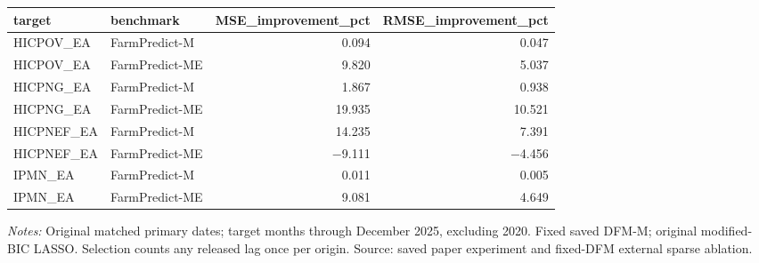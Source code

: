 \begin{threeparttable}
\begin{tabular}{llrr}
\toprule
target & benchmark & MSE\_improvement\_pct & RMSE\_improvement\_pct \\
\midrule
HICPOV\_EA & FarmPredict-M & 0.094 & 0.047 \\
HICPOV\_EA & FarmPredict-ME & 9.820 & 5.037 \\
HICPNG\_EA & FarmPredict-M & 1.867 & 0.938 \\
HICPNG\_EA & FarmPredict-ME & 19.935 & 10.521 \\
HICPNEF\_EA & FarmPredict-M & 14.235 & 7.391 \\
HICPNEF\_EA & FarmPredict-ME & $-$9.111 & $-$4.456 \\
IPMN\_EA & FarmPredict-M & 0.011 & 0.005 \\
IPMN\_EA & FarmPredict-ME & 9.081 & 4.649 \\
\bottomrule
\end{tabular}
\begin{tablenotes}[flushleft]\footnotesize
\item \textit{Notes:} Original matched primary dates; target months through December 2025, excluding 2020. Fixed saved DFM-M; original modified-BIC LASSO. Selection counts any released lag once per origin. Source: saved paper experiment and fixed-DFM external sparse ablation.
\end{tablenotes}
\end{threeparttable}
